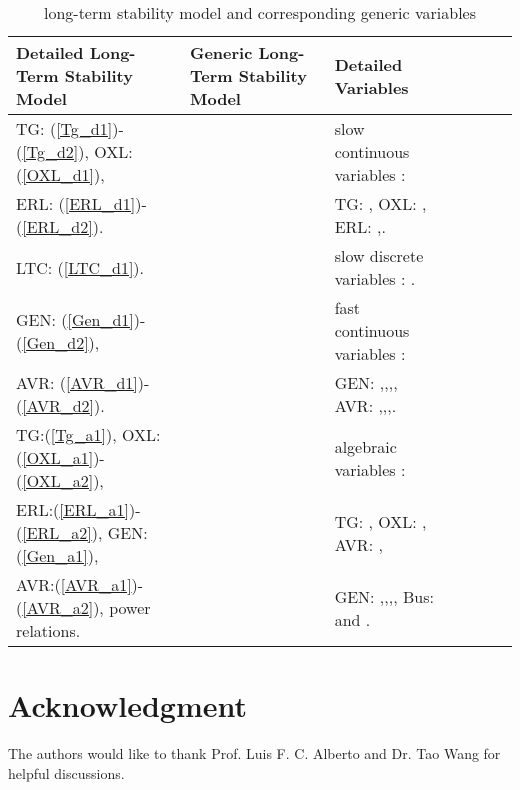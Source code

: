 \documentclass[journal]{IEEEtran}
\begin{document}
\begin{table*}
\caption{long-term stability model and corresponding generic variables}
\begin{center}\normalsize
\begin{tabular}{|*{7}{l|}}
\hline
Detailed Long-Term Stability Model&Generic Long-Term Stability Model&Detailed Variables\\
\hline
TG: (\ref{Tg_d1})-(\ref{Tg_d2}), OXL: (\ref{OXL_d1}),&&slow continuous variables :\\
ERL: (\ref{ERL_d1})-(\ref{ERL_d2}).&&TG: , OXL: , ERL: ,.\\
\hline
LTC: (\ref{LTC_d1}).&&slow discrete variables : .\\
\hline
GEN: (\ref{Gen_d1})-(\ref{Gen_d2}),&&fast continuous variables :\\
AVR: (\ref{AVR_d1})-(\ref{AVR_d2}).&&GEN: ,,,, AVR: ,,,.\\
\hline
TG:(\ref{Tg_a1}), OXL:(\ref{OXL_a1})-(\ref{OXL_a2}), &&algebraic variables :\\
ERL:(\ref{ERL_a1})-(\ref{ERL_a2}), GEN:(\ref{Gen_a1}),&&TG: , OXL: , AVR: ,\\
AVR:(\ref{AVR_a1})-(\ref{AVR_a2}), power relations.&&GEN: ,,,, Bus:  and .\\
\hline
\end{tabular}
\end{center}
\label{detailed&generic}
\end{table*}

\section*{Acknowledgment}
The authors would like to thank Prof. Luis F. C. Alberto and Dr. Tao Wang for helpful discussions.
\ifCLASSOPTIONcaptionsoff
  \newpage
\fi
\end{document}
